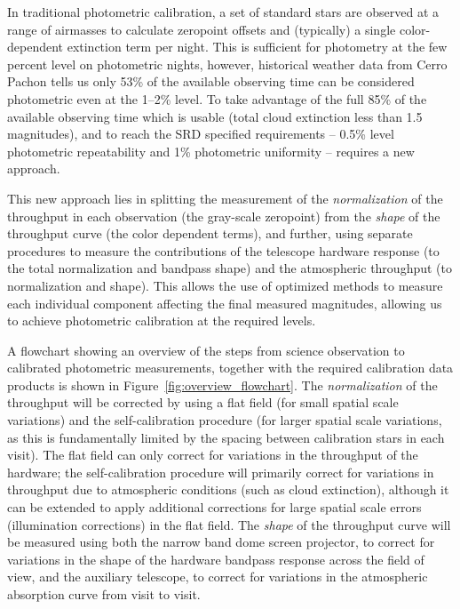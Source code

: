 \documentclass[12pt,preprint]{aastex}
\begin{document}
In traditional photometric calibration, a set of standard stars are
observed at a range of airmasses to calculate zeropoint offsets and
(typically) a single color-dependent extinction term per night. This is
sufficient for photometry at the few percent level on photometric
nights, however, historical weather data from Cerro Pachon tells us
only 53\% of the available observing time can be considered
photometric even at the 1--2\% level. To take advantage of the full
85\% of the available observing time which is usable (total cloud
extinction less than 1.5 magnitudes), and to reach the SRD specified
requirements -- 0.5\% level photometric repeatability and 1\%
photometric uniformity -- requires a new approach.

This new approach lies in splitting the measurement of the {\it
normalization} of the throughput in each observation (the gray-scale
zeropoint) from the {\it shape} of the throughput curve (the color
dependent terms), and further, using separate procedures to measure
the contributions of the telescope hardware response (to the total
normalization and bandpass shape) and the atmospheric throughput (to
normalization and shape). This allows the use of optimized methods to
measure each individual component affecting the final measured
magnitudes, allowing us to achieve photometric calibration at the
required levels.

A flowchart showing an overview of the steps from science observation
to calibrated photometric measurements, together with the required
calibration data products is shown in
Figure~\ref{fig:overview_flowchart}.  The {\it normalization} of the
throughput will be corrected by using a flat field (for small spatial
scale variations) and the self-calibration procedure (for larger
spatial scale variations, as this is fundamentally limited by the
spacing between calibration stars in each visit). The flat field can
only correct for variations in the throughput of the hardware; the
self-calibration procedure will primarily correct for variations in
throughput due to atmospheric conditions (such as cloud extinction),
although it can be extended to apply additional corrections for large
spatial scale errors (illumination corrections) in the flat field.
The {\it shape} of the throughput curve will be measured using both
the narrow band dome screen projector, to correct for variations in
the shape of the hardware bandpass response across the field of view,
and the auxiliary telescope, to correct for variations in the
atmospheric absorption curve from visit to visit. 
\end{document}
